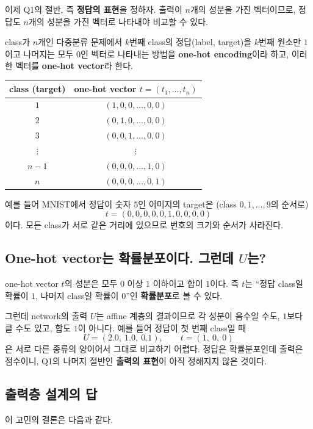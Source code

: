 \documentclass[11pt,a4paper]{article}
\begin{document}
이제 Q1의 절반, 즉 \textbf{정답의 표현}을 정하자.
출력이 $n$개의 성분을 가진 벡터이므로, 정답도 $n$개의 성분을 가진 벡터로 나타내야 비교할 수 있다.

class가 $n$개인 다중분류 문제에서 $k$번째 class의 정답(label, target)을
$k$번째 원소만 $1$이고 나머지는 모두 $0$인 벡터로 나타내는 방법을
\textbf{one-hot encoding}이라 하고, 이러한 벡터를 \textbf{one-hot vector}라 한다.

\begin{center}
\begin{tabular}{@{}cc@{}}
\toprule
class (target) & one-hot vector $t=(t_1,\ldots,t_n)$ \\
\midrule
$1$ & $(1,0,0,\ldots,0,0)$ \\
$2$ & $(0,1,0,\ldots,0,0)$ \\
$3$ & $(0,0,1,\ldots,0,0)$ \\
$\vdots$ & $\vdots$ \\
$n-1$ & $(0,0,0,\ldots,1,0)$ \\
$n$ & $(0,0,0,\ldots,0,1)$ \\
\bottomrule
\end{tabular}
\end{center}

예를 들어 MNIST에서 정답이 숫자 $5$인 이미지의 target은 (class $0,1,\ldots,9$의 순서로)
\[
t=(0,0,0,0,0,1,0,0,0,0)
\]
이다. 모든 class가 서로 같은 거리에 있으므로 번호의 크기와 순서가 사라진다.

\subsection{One-hot vector는 확률분포이다. 그런데 $U$는?}

one-hot vector $t$의 성분은 모두 $0$ 이상 $1$ 이하이고 합이 $1$이다.
즉 $t$는 ``정답 class일 확률이 $1$, 나머지 class일 확률이 $0$''인 \textbf{확률분포}로 볼 수 있다.

그런데 network의 출력 $U$는 affine 계층의 결과이므로
각 성분이 음수일 수도, $1$보다 클 수도 있고, 합도 $1$이 아니다.
예를 들어 정답이 첫 번째 class일 때
\[
U=(2.0,\ 1.0,\ 0.1),\qquad t=(1,\ 0,\ 0)
\]
은 서로 다른 종류의 양이어서 그대로 비교하기 어렵다.
정답은 확률분포인데 출력은 점수이니, Q1의 나머지 절반인 \textbf{출력의 표현}이 아직 정해지지 않은 것이다.

\subsection{출력층 설계의 답}

이 고민의 결론은 다음과 같다.
\end{document}
